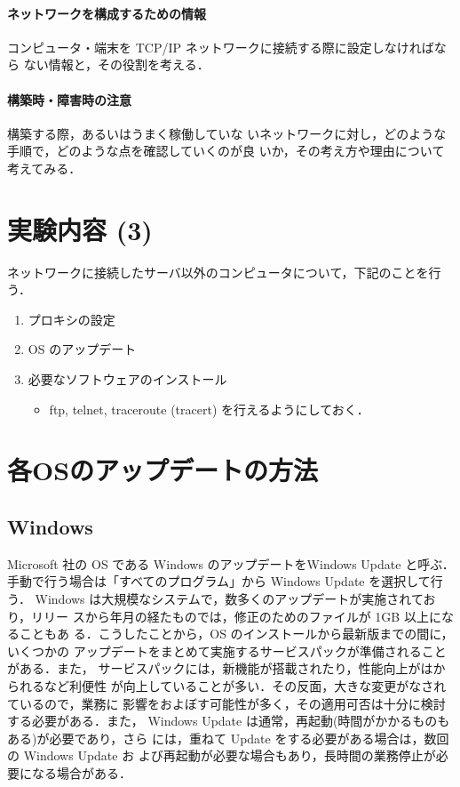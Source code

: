 \paragraph{ネットワークを構成するための情報}
コンピュータ・端末を TCP/IP ネットワークに接続する際に設定しなければなら
ない情報と，その役割を考える．

\paragraph{構築時・障害時の注意} 構築する際，あるいはうまく稼働していな
いネットワークに対し，どのような手順で，どのような点を確認していくのが良
いか，その考え方や理由について考えてみる．

\clearpage

\section{実験内容 (3)}

ネットワークに接続したサーバ以外のコンピュータについて，下記のことを行う．

\begin{enumerate}
 \item プロキシの設定
 \item OS のアップデート
 \item 必要なソフトウェアのインストール
       \begin{itemize}
	\item ftp, telnet, traceroute (tracert) を行えるようにしておく．
       \end{itemize}
\end{enumerate}

\section{各OSのアップデートの方法}

\subsection*{Windows}
Microsoft 社の OS である Windows のアップデートをWindows Update と呼ぶ．
手動で行う場合は「すべてのプログラム」から Windows Update を選択して行う．
Windows は大規模なシステムで，数多くのアップデートが実施されており，リリー
スから年月の経たものでは，修正のためのファイルが 1GB 以上になることもあ
る．こうしたことから，OS のインストールから最新版までの間に，いくつかの
アップデートをまとめて実施するサービスパックが準備されることがある．また，
サービスパックには，新機能が搭載されたり，性能向上がはかられるなど利便性
が向上していることが多い．その反面，大きな変更がなされているので，業務に
影響をおよぼす可能性が多く，その適用可否は十分に検討する必要がある．また，
Windows Update は通常，再起動(時間がかかるものもある)が必要であり，さら
には，重ねて Update をする必要がある場合は，数回の Windows Update お
よび再起動が必要な場合もあり，長時間の業務停止が必要になる場合がある．

